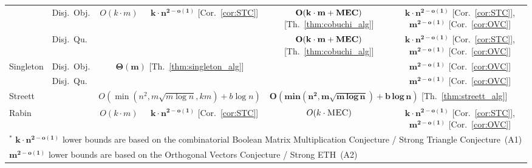 \documentclass[11pt,letterpaper]{article}
\newif\iffullversion
\newcommand{\infull}[1]{\iffullversion #1\fi}
\newcommand{\inshort}[1]{\iffullversion \else #1\fi}
\begin{document}
\begin{table*}[!t]
\begin{tabular}{@{}*{2}{l}*{4}{c}@{}}
\cmidrule{2-6}
& Disj.\ Obj. & \multirow{2}{*}{$O(k \cdot m)$} & 
\multirow{2}{*}{$\mathbf{k\cdot n^{2-o(1)}}$ \inshort{[Cor.~\ref{cor:STC}]}}
& $\mathbf{O(k \cdot m + \textsc{\bf MEC})}$ \inshort{[Th.~\ref{thm:cobuchi_alg}]} & $\mathbf{k\cdot n^{2-o(1)}}$ \inshort{[Cor.~\ref{cor:STC}]}, $\mathbf{m^{2-o(1)}}$ \inshort{[Cor.~\ref{cor:OVC}]}\\
& Disj.\ Qu. & & & $\mathbf{O(k \cdot m + \textsc{\bf MEC})}$ \inshort{[Th.~\ref{thm:cobuchi_alg}]} & $\mathbf{k\cdot n^{2-o(1)}}$ \inshort{[Cor.~\ref{cor:STC}]}, $\mathbf{m^{2-o(1)}}$ \inshort{[Cor.~\ref{cor:OVC}]}\\
\cmidrule{2-6}
Singleton & Disj.\ Obj.& \multicolumn{2}{c}{\multirow{2}{*}{$\mathbf{\Theta(m)}$ \inshort{[Th.~\ref{thm:singleton_alg}]}\phantom{abcdef}}} & & $\mathbf{m^{2-o(1)}}$ \inshort{[Cor.~\ref{cor:OVC}]}\\
& Disj.\ Qu. & & & & $\mathbf{m^{2-o(1)}}$ \inshort{[Cor.~\ref{cor:OVC}]}\\
\midrule
Streett & & \multicolumn{2}{l}{$O(\min(n^2, m \sqrt{m \log n}, k m) + b \log n)$
\cite{HenzingerT96,ChatterjeeHL15}}
& \multicolumn{2}{l}{$\mathbf{O(\textbf{min}(n^2, m \sqrt{m\,\textbf{log}\,n}) + b\,\textbf{log}\,n)}$ \inshort{[Th.~\ref{thm:streett_alg}]}}\\
\midrule
Rabin & & $O(k \cdot m)$ & 
$\mathbf{k\cdot n^{2-o(1)}}$ \inshort{[Cor.~\ref{cor:STC}]}
& $O(k \cdot \textsc{MEC})$ & 
$\mathbf{k\cdot n^{2-o(1)}}$ \inshort{[Cor.~\ref{cor:STC}]}, $\mathbf{m^{2-o(1)}}$ \inshort{[Cor.~\ref{cor:OVC}]}\\
\bottomrule
\multicolumn{6}{l}{$^*$ $\mathbf{k\cdot n^{2-o(1)}}$ lower bounds  are based on the \inshort{combinatorial Boolean Matrix Multiplication}\infull{BMM} Conjecture / Strong Triangle Conjecture~(A1)
} \\ 
\multicolumn{6}{l}{\phantom{$^*$} $\mathbf{m^{2-o(1)}}$ lower bounds are based on the Orthogonal Vectors Conjecture
/ Strong ETH~(A2)
}
\end{tabular}
\end{table*}
\end{document}
